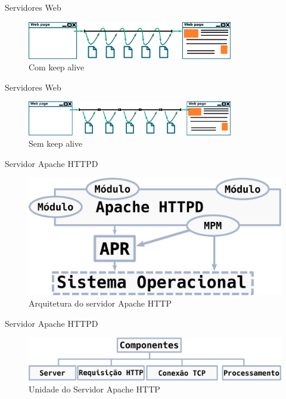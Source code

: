 \documentclass[xcolor={usenames,svgnames,dvipsnames},brazil,english,12pt,aspectratio=149]{beamer}
\begin{document}
\begin{frame}{Servidores Web}
  \begin{figure}[!h]
    \centering
    \includegraphics[width=0.8\textwidth]{keep_alive}
    \caption{Com keep alive}
    \label{fig:keep_alive}
  \end{figure}
\end{frame}

\begin{frame}{Servidores Web}
  \begin{figure}[!h]
    \centering
    \includegraphics[width=0.8\textwidth]{no_keep_alive}
    \caption{Sem keep alive}
    \label{fig:no_keep_alive}
  \end{figure}
\end{frame}

\begin{frame}{Servidor Apache HTTPD}
  \begin{figure}[!h]
    \centering
    \includegraphics[width=.7\textwidth]{apache_arhitecture} 
    \caption{Arquitetura do servidor Apache HTTP}
    \label{fig:apache_architecture} 
  \end{figure}
\end{frame}

\begin{frame}{Servidor Apache HTTPD}
  \begin{figure}[!h]
    \centering
    \includegraphics[width=.7\textwidth]{units} 
    \caption{Unidade do Servidor Apache HTTP}
    \label{fig:units} 
  \end{figure}
\end{frame}
\end{document}
